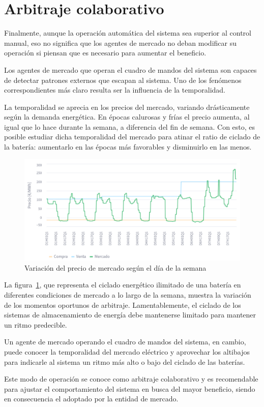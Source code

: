 \section{Arbitraje colaborativo}
\label{makereference7.5}

Finalmente, aunque la operación automática del sistema sea superior al control manual, eso no significa que los agentes de mercado no deban modificar su operación si piensan que es necesario para aumentar el beneficio.

Los agentes de mercado que operan el cuadro de mandos del sistema son capaces de detectar patrones externos que escapan al sistema. Uno de los fenómenos correspondientes más claro resulta ser la influencia de la temporalidad.

La temporalidad se aprecia en los precios del mercado, variando drásticamente según la demanda energética. En épocas calurosas y frías el precio aumenta, al igual que lo hace durante la semana, a diferencia del fin de semana. Con esto, es posible estudiar dicha temporalidad del mercado para atinar el ratio de ciclado de la batería: aumentarlo en las épocas más favorables y disminuirlo en las menos.

\begin{figure}
\centering
\includegraphics[width=0.5\linewidth]{figures/temporalidad-mercado.png}
\caption{Variación del precio de mercado según el día de la semana}
\label{fig:temporalidad-mercado}
\end{figure}

La figura~\ref{fig:temporalidad-mercado}, que representa el ciclado energético ilimitado de una batería en diferentes condiciones de mercado a lo largo de la semana, muestra la variación de los momentos oportunos de arbitraje. Lamentablemente, el ciclado de los sistemas de almacenamiento de energía debe mantenerse limitado para mantener un ritmo predecible.

Un agente de mercado operando el cuadro de mandos del sistema, en cambio, puede conocer la temporalidad del mercado eléctrico y aprovechar los altibajos para indicarle al sistema un ritmo más alto o bajo del ciclado de las baterías.

Este modo de operación se conoce como arbitraje colaborativo y es recomendable para ajustar el comportamiento del sistema en busca del mayor beneficio, siendo en consecuencia el adoptado por la entidad de mercado.
